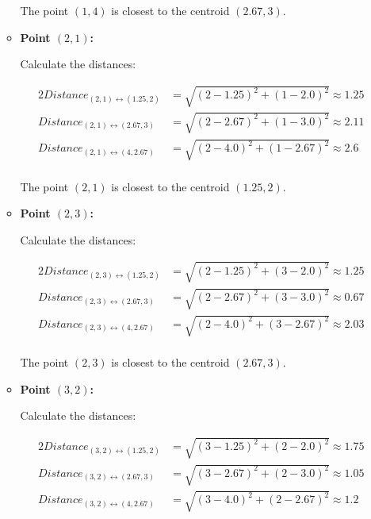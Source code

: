 \documentclass[
english,
smallborders
]{i6prcsht}
\begin{document}
\begin{solution}
\begin{enumerate}
\begin{itemize}
			            The point $(1,4)$ is closest to the centroid $(2.67,3)$.
			            
			      \item \textbf{Point $(2,1)$:}
			            
			            Calculate the distances:
			            
			            \begin{alignat*}{2}
				            Distance_{(2,1)\leftrightarrow(1.25,2)} & = \sqrt{(2-1.25)^2+(1-2.0)^2} \approx 1.25 \\
				            Distance_{(2,1)\leftrightarrow(2.67,3)} & = \sqrt{(2-2.67)^2+(1-3.0)^2} \approx 2.11 \\
				            Distance_{(2,1)\leftrightarrow(4,2.67)} & = \sqrt{(2-4.0)^2+(1-2.67)^2} \approx 2.6  \\
			            \end{alignat*}
			            
			            The point $(2,1)$ is closest to the centroid $(1.25,2)$.
			            
			      \item \textbf{Point $(2,3)$:}
			            
			            Calculate the distances:
			            
			            \begin{alignat*}{2}
				            Distance_{(2,3)\leftrightarrow(1.25,2)} & = \sqrt{(2-1.25)^2+(3-2.0)^2} \approx 1.25 \\
				            Distance_{(2,3)\leftrightarrow(2.67,3)} & = \sqrt{(2-2.67)^2+(3-3.0)^2} \approx 0.67 \\
				            Distance_{(2,3)\leftrightarrow(4,2.67)} & = \sqrt{(2-4.0)^2+(3-2.67)^2} \approx 2.03 \\
			            \end{alignat*}
			            
			            The point $(2,3)$ is closest to the centroid $(2.67,3)$.
			            
			      \item \textbf{Point $(3,2)$:}
			            
			            Calculate the distances:
			            
			            \begin{alignat*}{2}
				            Distance_{(3,2)\leftrightarrow(1.25,2)} & = \sqrt{(3-1.25)^2+(2-2.0)^2} \approx 1.75 \\
				            Distance_{(3,2)\leftrightarrow(2.67,3)} & = \sqrt{(3-2.67)^2+(2-3.0)^2} \approx 1.05 \\
				            Distance_{(3,2)\leftrightarrow(4,2.67)} & = \sqrt{(3-4.0)^2+(2-2.67)^2} \approx 1.2  \\
			            \end{alignat*}
			            

\end{itemize}
\end{enumerate}
\end{solution}
\end{document}
